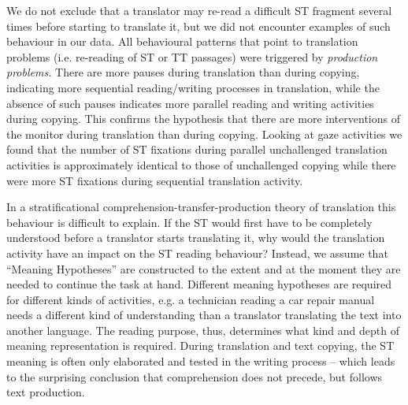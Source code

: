 \documentclass[output=paper]{LSP/langsci}
\begin{document}
We do not exclude that a translator may re-read a difficult ST fragment several times before starting to translate it, but we did not encounter examples of such behaviour in our data. All behavioural patterns that point to translation problems (i.e. re-reading of ST or TT passages) were triggered by \textit{production problems.} There are more pauses during translation than during copying, indicating more sequential reading/writing processes in translation, while the absence of such pauses indicates more parallel reading and writing activities during copying. This confirms the hypothesis that there are more interventions of the monitor during translation than during copying. Looking at gaze activities we found that the number of ST fixations during parallel unchallenged translation activities is approximately identical to those of unchallenged copying while there were more ST fixations during sequential translation activity.

In a stratificational comprehension-transfer-production theory of translation this behaviour is difficult to explain. If the ST would first have to be completely understood before a translator starts translating it, why would the translation activity have an impact on the ST reading behaviour? Instead, we assume that ``Meaning Hypotheses'' are constructed to the extent and at the moment they are needed to continue the task at hand. Different meaning hypotheses are required for different kinds of activities, e.g. a technician reading a car repair manual needs a different kind of understanding than a translator translating the text into another language. The reading purpose, thus, determines what kind and depth of meaning representation is required. During translation and text copying, the ST meaning is often only elaborated and tested in the writing process -- which leads to the surprising conclusion that comprehension does not precede, but follows text production. 
 
\sloppy
\printbibliography[heading=subbibliography,notkeyword=this]
\end{document}
